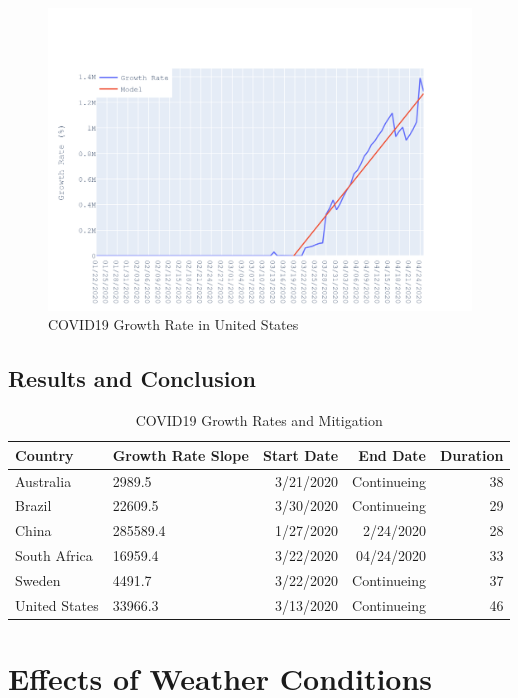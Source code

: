 \documentclass{homework}
\begin{document}
\begin{figure}[H]
  \centering
  \includegraphics[scale=0.3]{task3/US.png}
  \caption{COVID19 Growth Rate in United States}
\end{figure}

\newpage
\subsection{Results and Conclusion}
\begin{table}[H]
  \caption{COVID19 Growth Rates and Mitigation}
  \label{Task 3 Results}
  \centering
  \begin{tabular}{llrrr}
    \toprule
    Country       & Growth Rate Slope & Start Date & End Date    & Duration \\
    \midrule
    Australia     & 2989.5            & 3/21/2020  & Continueing & 38       \\
    Brazil        & 22609.5           & 3/30/2020  & Continueing & 29       \\
    China         & 285589.4          & 1/27/2020  & 2/24/2020   & 28       \\
    South Africa  & 16959.4           & 3/22/2020  & 04/24/2020  & 33       \\
    Sweden        & 4491.7            & 3/22/2020  & Continueing & 37       \\
    United States & 33966.3           & 3/13/2020  & Continueing & 46       \\
    \bottomrule
  \end{tabular}
\end{table}

\newpage
\section{Effects of Weather Conditions}
\end{document}
